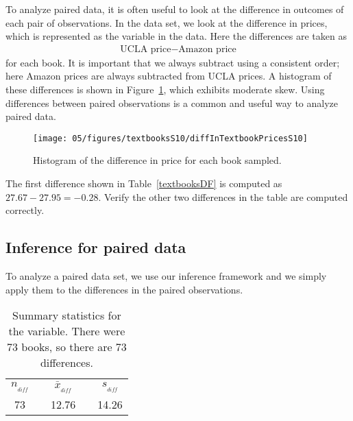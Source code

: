 To analyze paired data, it is often useful to look at the difference in outcomes of each pair of observations. In the  data set, we look at the difference in prices, which is represented as the  variable in the  data. Here the differences are taken as
\begin{eqnarray*}
\text{UCLA price} - \text{Amazon price}
\end{eqnarray*}
for each book. It is important that we always subtract using a consistent order; here Amazon prices are always subtracted from UCLA prices. A histogram of these differences is shown in Figure~\ref{diffInTextbookPricesS10}, which exhibits moderate skew. Using differences between paired observations is a common and useful way to analyze paired data. %

\begin{figure}
\centering
\texttt{[image: 05/figures/textbooksS10/diffInTextbookPricesS10]}
\caption{Histogram of the difference in price for each book sampled.}
\label{diffInTextbookPricesS10}
\end{figure}

\begin{exercise}
The first difference shown in Table~\ref{textbooksDF} is computed as $27.67-27.95=-0.28$. Verify the other two differences in the table are computed correctly.
\end{exercise}


\subsection{Inference for paired data}

To analyze a paired data set, we use our inference framework and we simply apply them to the differences in the paired observations. %

\begin{table}[hh]
\centering
\begin{tabular}{ccccc}
\hline
$n_{_{diff}}$	&\hspace{3mm}& $\bar{x}_{_{diff}}$	&\hspace{3mm}& $s_{_{diff}}$ \vspace{1mm}\\
73			&& 12.76				&& 14.26 \\
\hline
\end{tabular}
\caption{Summary statistics for the  variable. There were 73 books, so there are 73 differences.}
\label{textbooksSummaryStats}
\end{table}


